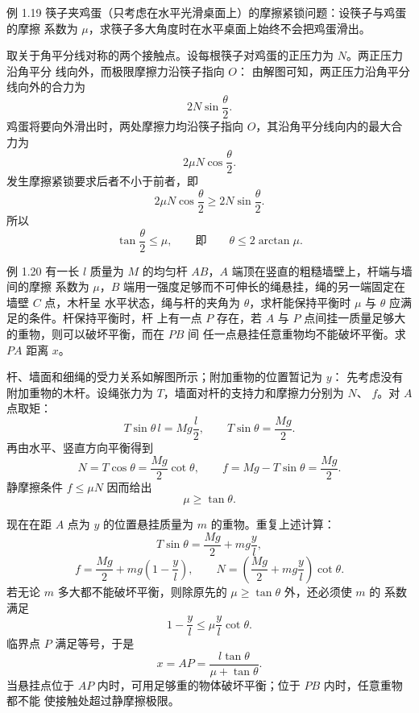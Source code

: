 \begin{origexamplebox}{例 1.19}
筷子夹鸡蛋（只考虑在水平光滑桌面上）的摩擦紧锁问题：设筷子与鸡蛋的摩擦
系数为 $\mu$，求筷子多大角度时在水平桌面上始终不会把鸡蛋滑出。
\end{origexamplebox}

\begin{xesolution}
取关于角平分线对称的两个接触点。设每根筷子对鸡蛋的正压力为 $N$。两正压力沿角平分
线向外，而极限摩擦力沿筷子指向 $O$：
\soldiagOneNineteen
由解图可知，两正压力沿角平分线向外的合力为
\[
  2N\sin\frac\theta2.
\]
鸡蛋将要向外滑出时，两处摩擦力均沿筷子指向 $O$，其沿角平分线向内的最大合力为
\[
  2\mu N\cos\frac\theta2.
\]
发生摩擦紧锁要求后者不小于前者，即
\[
  2\mu N\cos\frac\theta2\ge 2N\sin\frac\theta2.
\]
所以
\[
  \boxed{\tan\frac\theta2\le\mu},
  \qquad\text{即}\qquad
  \boxed{\theta\le2\arctan\mu}.
\]
\end{xesolution}

\begin{origexamplebox}{例 1.20}
有一长 $l$ 质量为 $M$ 的均匀杆 $AB$，$A$ 端顶在竖直的粗糙墙壁上，杆端与墙间的摩擦
系数为 $\mu$，$B$ 端用一强度足够而不可伸长的绳悬挂，绳的另一端固定在墙壁 $C$ 点，木杆呈
水平状态，绳与杆的夹角为 $\theta$，求杆能保持平衡时 $\mu$ 与 $\theta$ 应满足的条件。杆保持平衡时，杆
上有一点 $P$ 存在，若 $A$ 与 $P$ 点间挂一质量足够大的重物，则可以破坏平衡，而在 $PB$ 间
任一点悬挂任意重物均不能破坏平衡。求 $PA$ 距离 $x$。
\end{origexamplebox}

\begin{xesolution}
杆、墙面和细绳的受力关系如解图所示；附加重物的位置暂记为 $y$：
\soldiagOneTwenty
先考虑没有附加重物的木杆。设绳张力为 $T$，墙面对杆的支持力和摩擦力分别为 $N$、
$f$。对 $A$ 点取矩：
\[
  T\sin\theta\,l=Mg\frac l2,
  \qquad
  T\sin\theta=\frac{Mg}{2}.
\]
再由水平、竖直方向平衡得到
\[
  N=T\cos\theta=\frac{Mg}{2}\cot\theta,
  \qquad
  f=Mg-T\sin\theta=\frac{Mg}{2}.
\]
静摩擦条件 $f\le\mu N$ 因而给出
\[
  \boxed{\mu\ge\tan\theta}.
\]

现在在距 $A$ 点为 $y$ 的位置悬挂质量为 $m$ 的重物。重复上述计算：
\[
  T\sin\theta=\frac{Mg}{2}+mg\frac yl,
\]
\[
  f=\frac{Mg}{2}+mg\left(1-\frac yl\right),
  \qquad
  N=\left(\frac{Mg}{2}+mg\frac yl\right)\cot\theta.
\]
若无论 $m$ 多大都不能破坏平衡，则除原先的 $\mu\ge\tan\theta$ 外，还必须使 $m$ 的
系数满足
\[
  1-\frac yl\le\mu\frac yl\cot\theta.
\]
临界点 $P$ 满足等号，于是
\[
  \boxed{x=AP=\frac{l\tan\theta}{\mu+\tan\theta}}.
\]
当悬挂点位于 $AP$ 内时，可用足够重的物体破坏平衡；位于 $PB$ 内时，任意重物都不能
使接触处超过静摩擦极限。
\end{xesolution}

